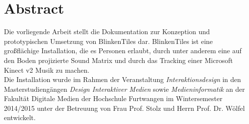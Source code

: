 \section*{Abstract}
Die vorliegende Arbeit stellt die Dokumentation zur Konzeption und prototypischen Umsetzung von BlinkenTiles dar. BlinkenTiles ist eine großflächige Installation, die es Personen erlaubt, durch unter anderem eine auf den Boden projizierte Sound Matrix und durch das Tracking einer Microsoft Kinect v2 Musik zu machen.\\
Die Installation wurde im Rahmen der Veranstaltung \textit{Interaktionsdesign} in den Masterstudiengängen \textit{Design Interaktiver Medien} sowie \textit{Medieninformatik} an der Fakultät Digitale Medien der Hochschule Furtwangen im Wintersemester 2014/2015 unter der Betreuung von Frau Prof. Stolz und Herrn Prof. Dr. Wölfel entwickelt.